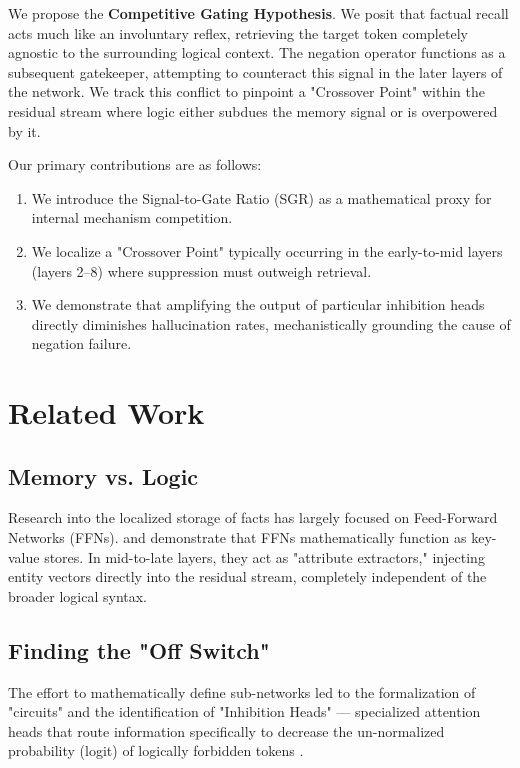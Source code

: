 \documentclass[11pt]{article}
\begin{document}
We propose the \textbf{Competitive Gating Hypothesis}. We posit that factual recall acts much like an involuntary reflex, retrieving the target token completely agnostic to the surrounding logical context. The negation operator functions as a subsequent gatekeeper, attempting to counteract this signal in the later layers of the network. We track this conflict to pinpoint a "Crossover Point" within the residual stream where logic either subdues the memory signal or is overpowered by it.

Our primary contributions are as follows:
\begin{enumerate}
    \item We introduce the Signal-to-Gate Ratio (SGR) as a mathematical proxy for internal mechanism competition.
    \item We localize a "Crossover Point" typically occurring in the early-to-mid layers (layers 2--8) where suppression must outweigh retrieval.
    \item We demonstrate that amplifying the output of particular inhibition heads directly diminishes hallucination rates, mechanistically grounding the cause of negation failure.
\end{enumerate}

\section{Related Work}
\label{sec:related}

\subsection{Memory vs. Logic}
Research into the localized storage of facts has largely focused on Feed-Forward Networks (FFNs). \citet{geva2021} and \citet{dai2022} demonstrate that FFNs mathematically function as key-value stores. In mid-to-late layers, they act as "attribute extractors," injecting entity vectors directly into the residual stream, completely independent of the broader logical syntax. 

\subsection{Finding the "Off Switch"}
The effort to mathematically define sub-networks led to the formalization of "circuits" and the identification of "Inhibition Heads" — specialized attention heads that route information specifically to decrease the un-normalized probability (logit) of logically forbidden tokens \citep{wang2023}.
\end{document}
